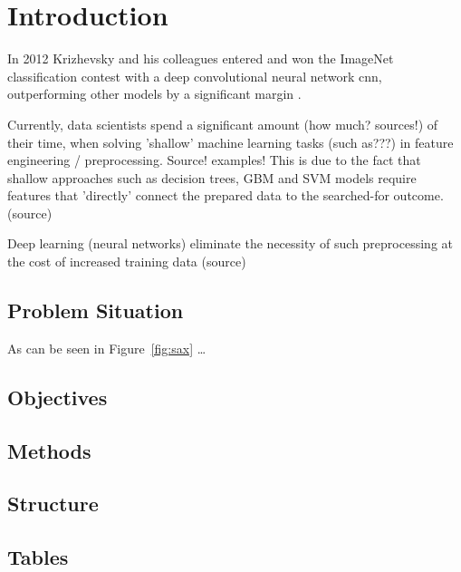 \chapter{Introduction}

In 2012 Krizhevsky and his colleagues entered and won the ImageNet classification contest with a deep convolutional neural network \ac{cnn}, outperforming other models by a significant margin \cite{krizhevsky2012imagenet}. 

Currently, data scientists spend a significant amount (how much? sources!) of their time, when solving 'shallow' machine learning tasks (such as???) in feature engineering / preprocessing. Source! examples!
This is due to the fact that shallow approaches such as decision trees, GBM and SVM models require features that 'directly' connect the prepared data to the searched-for outcome. (source) 

Deep learning (neural networks) eliminate the necessity of such preprocessing at the cost of increased training data (source) 

\blindtext \citet{Shearer2000}

\section{Problem Situation}

\blindtext


As can be seen in Figure~\ref{fig:sax} \ldots

\section{Objectives}

\blindtext

\section{Methods}

\blindtext

\section{Structure}

\blindtext

\section{Tables}

